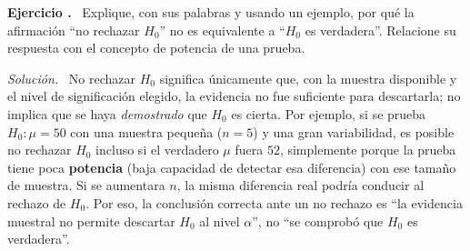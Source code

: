 \documentclass[11pt,a4paper]{article}
\newcounter{ejnum}
\newenvironment{ejercicio}{\refstepcounter{ejnum}\par\medskip\noindent\textbf{Ejercicio \theejnum.}~}{\par}
\newenvironment{solucion}{\par\noindent\textit{Solución.}~}{\par\vspace{1em}}
\begin{document}
\begin{ejercicio}
Explique, con sus palabras y usando un ejemplo, por qué la afirmación ``no rechazar $H_0$'' no es equivalente a ``$H_0$ es verdadera''. Relacione su respuesta con el concepto de potencia de una prueba.
\end{ejercicio}

\begin{solucion}
No rechazar $H_0$ significa únicamente que, con la muestra disponible y el nivel de significación elegido, la evidencia no fue suficiente para descartarla; no implica que se haya \emph{demostrado} que $H_0$ es cierta. Por ejemplo, si se prueba $H_0:\mu=50$ con una muestra pequeña ($n=5$) y una gran variabilidad, es posible no rechazar $H_0$ incluso si el verdadero $\mu$ fuera $52$, simplemente porque la prueba tiene poca \textbf{potencia} (baja capacidad de detectar esa diferencia) con ese tamaño de muestra. Si se aumentara $n$, la misma diferencia real podría conducir al rechazo de $H_0$. Por eso, la conclusión correcta ante un no rechazo es ``la evidencia muestral no permite descartar $H_0$ al nivel $\alpha$'', no ``se comprobó que $H_0$ es verdadera''.
\end{solucion}
\end{document}
